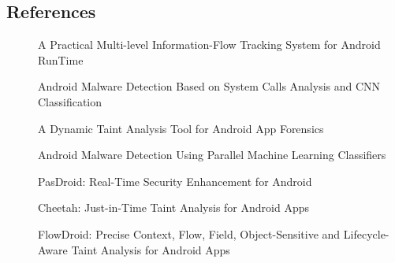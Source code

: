 \documentclass{article}
\begin{document}
\subsection{References}
  \begin{description}
    \item[\cite{Sun2016CCS}] A Practical Multi-level Information-Flow Tracking System for Android RunTime
    \item[\cite{ABDE2019WCNCW}] Android Malware Detection Based on System Calls Analysis and CNN Classification
    \item[\cite{Xu2018SPW}] A Dynamic Taint Analysis Tool for Android App Forensics
    \item[\cite{Yerima2014NGMAST}] Android Malware Detection Using Parallel Machine Learning Classifiers
    \item[\cite{Hsiao2014IMIS}] PasDroid: Real-Time Security Enhancement for Android
    \item[\cite{Ngu2017ICSE}] Cheetah: Just-in-Time Taint Analysis for Android Apps
    \item[\cite{Arzt2014SIGPLAN}]  FlowDroid: Precise Context, Flow, Field, Object-Sensitive and Lifecycle-Aware Taint Analysis for Android Apps
  \end{description}
  \label{sec:TaintDroid} 
  
\end{document}
